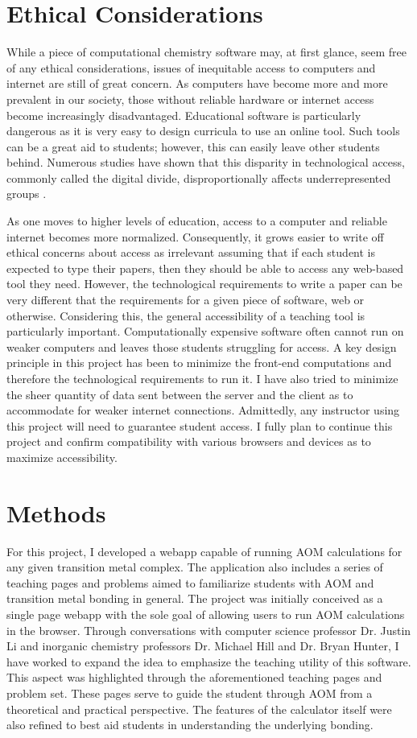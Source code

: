\documentclass[10pt,twocolumn]{article}
\begin{document}
\section{Ethical Considerations}
While a piece of computational chemistry software may, at first glance, seem free of any ethical considerations, issues of inequitable access to computers and internet are still of great concern. As computers have become more and more prevalent in our society, those without reliable hardware or internet access become increasingly disadvantaged. Educational software is particularly dangerous as it is very easy to design curricula to use an online tool. Such tools can be a great aid to students; however, this can easily leave other students behind. Numerous studies have shown that this disparity in technological access, commonly called the digital divide, disproportionally affects underrepresented groups \cite{van2006}.

As one moves to higher levels of education, access to a computer and reliable internet becomes more normalized. Consequently, it grows easier to write off ethical concerns about access as irrelevant assuming that if each student is expected to type their papers, then they should be able to access any web-based tool they need. However, the technological requirements to write a paper can be very different that the requirements for a given piece of software, web or otherwise. Considering this, the general accessibility of a teaching tool is particularly important. Computationally expensive software often cannot run on weaker computers and leaves those students struggling for access. A key design principle in this project has been to minimize the front-end computations and therefore the technological requirements to run it. I have also tried to minimize the sheer quantity of data sent between the server and the client as to accommodate for weaker internet connections. Admittedly, any instructor using this project will need to guarantee student access. I fully plan to continue this project and confirm compatibility with various browsers and devices as to maximize accessibility. 

\section{Methods}
For this project, I developed a webapp capable of running AOM calculations for any given transition metal complex. The application also includes a series of teaching pages and problems aimed to familiarize students with AOM and transition metal bonding in general. The project was initially conceived as a single page webapp with the sole goal of allowing users to run AOM calculations in the browser. Through conversations with computer science professor Dr. Justin Li and inorganic chemistry professors Dr. Michael Hill and Dr. Bryan Hunter, I have worked to expand the idea to emphasize the teaching utility of this software. This aspect was highlighted through the aforementioned teaching pages and problem set. These pages serve to guide the student through AOM from a theoretical and practical perspective. The features of the calculator itself were also refined to best aid students in understanding the underlying bonding.
\end{document}
